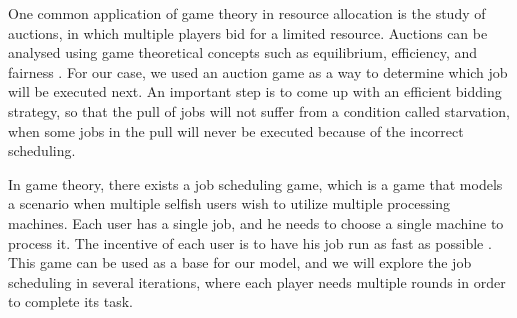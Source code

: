 One common application of game theory in resource allocation is the study of auctions, in which multiple players bid for a limited resource. Auctions can be analysed using game theoretical concepts such as equilibrium, efficiency, and fairness \cite{9244046}. For our case, we used an auction game as a way to determine which job will be executed next. An important step is to come up with an efficient bidding strategy, so that the pull of jobs will not suffer from a condition called starvation, when some jobs in the pull will never be executed because of the incorrect scheduling.

In game theory, there exists a job scheduling game, which is a game that models a scenario when multiple selfish users wish to utilize multiple processing machines. Each user has a single job, and he needs to choose a single machine to process it. The incentive of each user is to have his job run as fast as possible \cite{noauthor_job_2021}. This game can be used as a base for our model, and we will explore the job scheduling in several iterations, where each player needs multiple rounds in order to complete its task.
